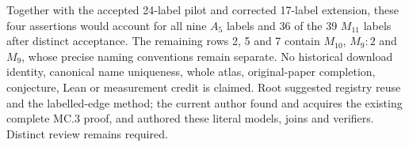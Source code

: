 \documentclass[11pt]{article}
\begin{document}
Together with the accepted 24-label pilot and corrected 17-label extension,
these four assertions would account for all nine $A_5$ labels and 36 of the
39 $M_{11}$ labels after distinct acceptance. The remaining rows 2, 5 and 7
contain $M_{10}$, $M_9:2$ and $M_9$, whose precise naming conventions remain
separate. No historical download identity, canonical name uniqueness, whole
atlas, original-paper completion, conjecture, Lean or measurement credit is
claimed. Root suggested registry reuse and the labelled-edge method; the
current author found and acquires the existing complete MC.3 proof, and
authored these literal models, joins and verifiers. Distinct review remains
required.
\end{document}
